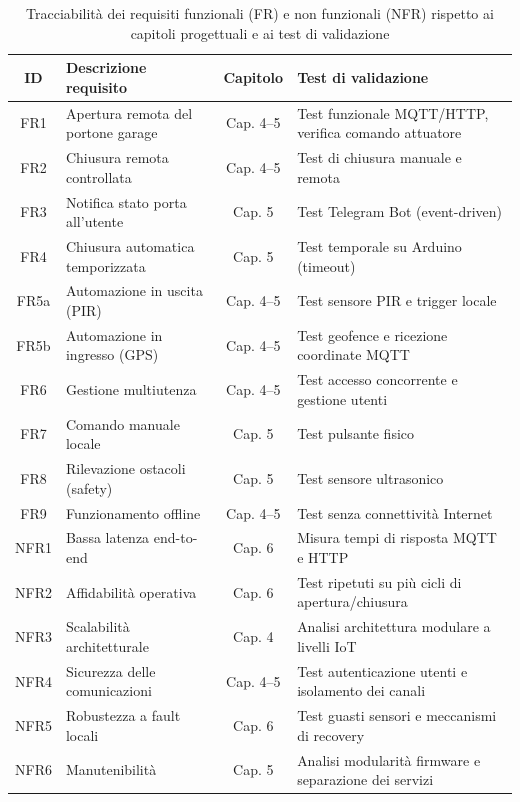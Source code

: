 \begin{table}[H]
\centering
\caption{Tracciabilità dei requisiti funzionali (FR) e non funzionali (NFR) rispetto ai capitoli progettuali e ai test di validazione}
\label{tab:fr_nfr_mapping}
\renewcommand{\arraystretch}{1.2}
\begin{tabular}{|c|p{4.2cm}|c|p{5.2cm}|}
\hline
\textbf{ID} & \textbf{Descrizione requisito} & \textbf{Capitolo} & \textbf{Test di validazione} \\
\hline
FR1 & Apertura remota del portone garage & Cap. 4–5 & Test funzionale MQTT/HTTP, verifica comando attuatore \\
\hline
FR2 & Chiusura remota controllata & Cap. 4–5 & Test di chiusura manuale e remota \\
\hline
FR3 & Notifica stato porta all’utente & Cap. 5 & Test Telegram Bot (event-driven) \\
\hline
FR4 & Chiusura automatica temporizzata & Cap. 5 & Test temporale su Arduino (timeout) \\
\hline
FR5a & Automazione in uscita (PIR) & Cap. 4–5 & Test sensore PIR e trigger locale \\
\hline
FR5b & Automazione in ingresso (GPS) & Cap. 4–5 & Test geofence e ricezione coordinate MQTT \\
\hline
FR6 & Gestione multiutenza & Cap. 4–5 & Test accesso concorrente e gestione utenti \\
\hline
FR7 & Comando manuale locale & Cap. 5 & Test pulsante fisico \\
\hline
FR8 & Rilevazione ostacoli (safety) & Cap. 5 & Test sensore ultrasonico \\
\hline
FR9 & Funzionamento offline & Cap. 4–5 & Test senza connettività Internet \\
\hline
NFR1 & Bassa latenza end-to-end & Cap. 6 & Misura tempi di risposta MQTT e HTTP \\
\hline
NFR2 & Affidabilità operativa & Cap. 6 & Test ripetuti su più cicli di apertura/chiusura \\
\hline
NFR3 & Scalabilità architetturale & Cap. 4 & Analisi architettura modulare a livelli IoT \\
\hline
NFR4 & Sicurezza delle comunicazioni & Cap. 4–5 & Test autenticazione utenti e isolamento dei canali \\
\hline
NFR5 & Robustezza a fault locali & Cap. 6 & Test guasti sensori e meccanismi di recovery \\
\hline
NFR6 & Manutenibilità & Cap. 5 & Analisi modularità firmware e separazione dei servizi \\

\end{tabular}
\end{table}
